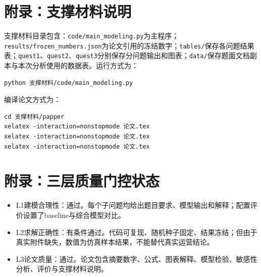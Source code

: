 \documentclass[UTF8,a4paper,12pt]{ctexart}
\begin{document}
\appendix
\section{附录：支撑材料说明}
支撑材料目录包含：\verb|code/main_modeling.py|为主程序；\verb|results/frozen_numbers.json|为论文引用的冻结数字；\verb|tables/|保存各问题结果表；\verb|quest1|、\verb|quest2|、\verb|quest3|分别保存分问题输出和图表；\verb|data/|保存题面文档副本与本次分析使用的数据表。运行方式为：
\begin{verbatim}
python 支撑材料/code/main_modeling.py
\end{verbatim}
编译论文方式为：
\begin{verbatim}
cd 支撑材料/papper
xelatex -interaction=nonstopmode 论文.tex
xelatex -interaction=nonstopmode 论文.tex
xelatex -interaction=nonstopmode 论文.tex
\end{verbatim}

\section{附录：三层质量门控状态}
\begin{itemize}
\item L1建模合理性：通过。每个子问题均给出题目要求、模型输出和解释；配置评价设置了baseline与综合模型对比。
\item L2求解正确性：有条件通过。代码可复现、随机种子固定、结果冻结；但由于真实附件缺失，数值为仿真样本结果，不能替代真实运营结论。
\item L3论文质量：通过。论文包含摘要数字、公式、图表解释、模型检验、敏感性分析、评价与支撑材料说明。
\end{itemize}
\end{document}
